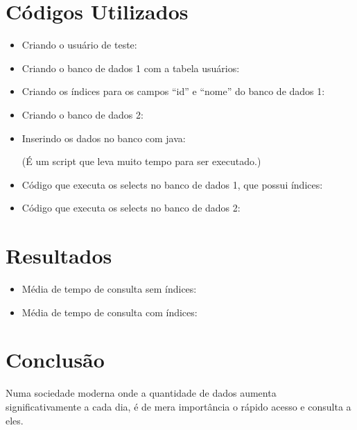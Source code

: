 \documentclass[12pt,a4paper]{article}
\begin{document}
\section{Códigos Utilizados}

\begin{itemize}
	\item Criando o usuário de teste:
		
	\item Criando o banco de dados 1 com a tabela usuários:	
		
	\item Criando os índices para os campos “id” e “nome” do banco de dados 1:	
		
	\item Criando o banco de dados 2:	
		
	\item Inserindo os dados no banco com java:	
		
	(É um script que leva muito tempo para ser executado.)
	\item Código que executa os selects no banco de dados 1, que possui índices:	
		
	\item Código que executa os selects no banco de dados 2:	
		
		
\end{itemize}

\section{Resultados}

\begin{itemize}

	\item Média de tempo de consulta sem índices:
	
	\item Média de tempo de consulta com índices:	
	
\end{itemize}

\section{Conclusão}

Numa sociedade moderna onde a quantidade de dados aumenta significativamente a cada dia, é de mera importância o rápido acesso e consulta a eles.
\end{document}
